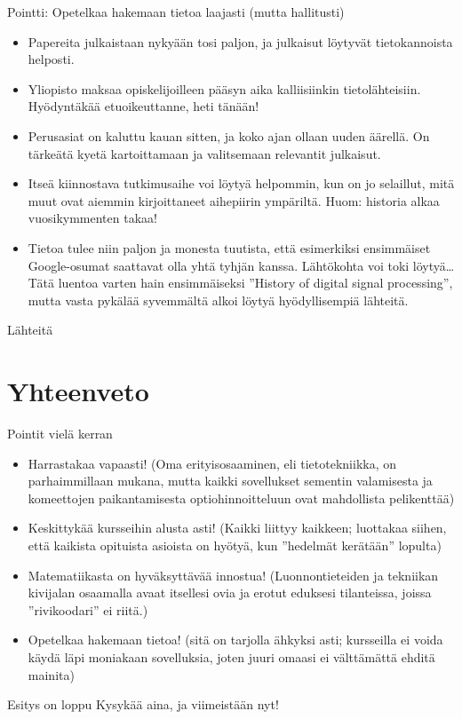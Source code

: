 \documentclass[pdf,9pt,handout]{beamer}
\begin{document}
\begin{frame}{Pointti: Opetelkaa hakemaan tietoa laajasti (mutta hallitusti)}
  \begin{itemize}
  \item
    Papereita julkaistaan nykyään tosi paljon, ja julkaisut löytyvät
    tietokannoista helposti. 
  \item Yliopisto maksaa opiskelijoilleen pääsyn aika kalliisiinkin
    tietolähteisiin. Hyödyntäkää etuoikeuttanne, heti tänään!
  \item Perusasiat on kaluttu kauan sitten, ja
    koko ajan ollaan uuden äärellä. On tärkeätä kyetä kartoittamaan ja
    valitsemaan relevantit julkaisut.
  \item Itseä kiinnostava tutkimusaihe voi löytyä helpommin, kun on jo
    selaillut, mitä muut ovat aiemmin kirjoittaneet aihepiirin
    ympäriltä. Huom: historia alkaa vuosikymmenten takaa!
  \item Tietoa tulee niin paljon ja monesta tuutista, että esimerkiksi
    ensimmäiset Google-osumat saattavat olla yhtä tyhjän
    kanssa. Lähtökohta voi toki löytyä\ldots Tätä luentoa varten hain
    ensimmäiseksi ''History of digital signal processing'', mutta
    vasta pykälää syvemmältä alkoi löytyä hyödyllisempiä lähteitä.
  \end{itemize}
\end{frame}

\beamerdefaultoverlayspecification{}
\begin{frame}[allowframebreaks]{Lähteitä}

  \tiny
  
  

\end{frame}

\beamerdefaultoverlayspecification{<+->}

\section{Yhteenveto}
\begin{frame}{Pointit vielä kerran}
\begin{itemize}
\item Harrastakaa vapaasti! (Oma erityisosaaminen, eli tietotekniikka,
  on parhaimmillaan mukana, mutta kaikki sovellukset sementin
  valamisesta ja komeettojen paikantamisesta optiohinnoitteluun ovat
  mahdollista pelikenttää)
\item Keskittykää kursseihin alusta asti! (Kaikki liittyy kaikkeen;
  luottakaa siihen, että kaikista opituista asioista on hyötyä, kun
  ''hedelmät kerätään'' lopulta)
\item Matematiikasta on hyväksyttävää innostua! (Luonnontieteiden ja
  tekniikan kivijalan osaamalla avaat itsellesi ovia ja erotut
  eduksesi tilanteissa, joissa ''rivikoodari'' ei riitä.)
\item Opetelkaa hakemaan tietoa! (sitä on tarjolla ähkyksi asti;
  kursseilla ei voida käydä läpi moniakaan sovelluksia, joten juuri
  omaasi ei välttämättä ehditä mainita)
  
\end{itemize}
\end{frame}

\begin{frame}{Esitys on loppu}
  Kysykää aina, ja viimeistään nyt!
\end{frame}
\end{document}
